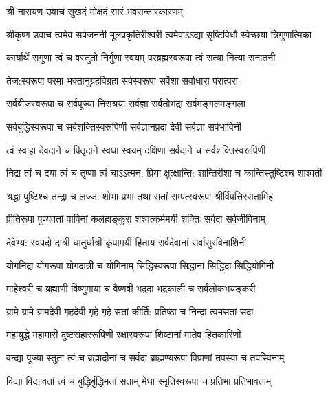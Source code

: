
श्री नारायण उवाच
{सुखदं मोक्षदं सारं भवसन्तारकारणम्}

श्रीकृष्ण उवाच
\twolineshloka
{त्वमेव सर्वजननी मूलप्रकृतिरीश्वरी}
{त्वमेवाऽऽद्या सृष्टिविधौ स्वेच्छया त्रिगुणात्मिका}

\twolineshloka
{कार्यार्थे सगुणा त्वं च वस्तुतो निर्गुणा स्वयम्}
{परब्रह्मस्वरूपा त्वं सत्या नित्या सनातनी}

\twolineshloka
{तेज:स्वरूपा परमा भक्तानुग्रहविग्रहा}
{सर्वस्वरूपा सर्वेशा सर्वाधारा परात्परा}

\twolineshloka
{सर्वबीजस्वरूपा च सर्वपूज्या निराश्रया}
{सर्वज्ञा सर्वतोभद्रा सर्वमङ्गलमङ्गला}

\twolineshloka
{सर्वबुद्धिस्वरूपा च सर्वशक्तिस्वरूपिणी}
{सर्वज्ञानप्रदा देवी सर्वज्ञा सर्वभाविनी}

\twolineshloka
{त्वं स्वाहा देवदाने च पितृदाने स्वधा स्वयम्}
{दक्षिणा सर्वदाने च सर्वशक्तिस्वरूपिणी}

\twolineshloka
{निद्रा त्वं च दया त्वं च तृष्णा त्वं चाऽऽत्मन: प्रिया}
{क्षुत्क्षान्ति: शान्तिरीशा च कान्तिस्तुष्टिश्च शाश्वती}

\twolineshloka
{श्रद्धा पुष्टिश्च तन्द्रा च लज्जा शोभा प्रभा तथा}
{सतां सम्पत्स्वरूपा श्रीर्विपत्तिरसतामिह}

\twolineshloka
{प्रीतिरूपा पुण्यवतां पापिनां कलहाङ्कुरा}
{शश्वत्कर्ममयी शक्तिः सर्वदा सर्वजीविनाम्}

\twolineshloka
{देवेभ्य: स्वपदो दात्री धातुर्धात्री कृपामयी}
{हिताय सर्वदेवानां सर्वासुरविनाशिनी}

\twolineshloka
{योगनिद्रा योगरूपा योगदात्री च योगिनाम्}
{सिद्धिस्वरूपा सिद्धानां सिद्धिदा सिद्धियोगिनी}

\twolineshloka
{माहेश्वरी च ब्रह्माणी विष्णुमाया च वैष्णवी}
{भद्रदा भद्रकाली च सर्वलोकभयङ्करी}

\twolineshloka
{ग्रामे ग्रामे ग्रामदेवी गृहदेवी गृहे गृहे}
{सतां कीर्ति: प्रतिष्ठा च निन्दा त्वमसतां सदा}

\twolineshloka
{महायुद्धे महामारी दुष्टसंहाररूपिणी}
{रक्षास्वरूपा शिष्टानां मातेव हितकारिणी}

\twolineshloka
{वन्द्या पूज्या स्तुता त्वं च ब्रह्मादीनां च सर्वदा}
{ब्राह्मण्यरूपा विप्राणां तपस्या च तपस्विनाम्}

\twolineshloka
{विद्या विद्यावतां त्वं च बुद्धिर्बुद्धिमतां सताम्}
{मेधा स्मृतिस्वरूपा च प्रतिभा प्रतिभावताम्}

